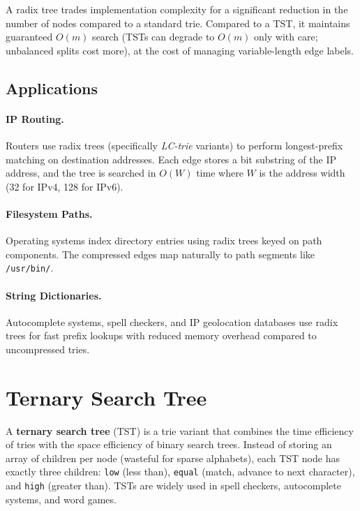 \noindent
A radix tree trades implementation complexity for a significant reduction in the number of nodes compared to a standard trie. Compared to a TST, it maintains guaranteed $O(m)$ search (TSTs can degrade to $O(m)$ only with care; unbalanced splits cost more), at the cost of managing variable-length edge labels.

\subsection{Applications}

\paragraph{IP Routing.} Routers use radix trees (specifically \emph{LC-trie} variants) to perform longest-prefix matching on destination addresses. Each edge stores a bit substring of the IP address, and the tree is searched in $O(W)$ time where $W$ is the address width (32 for IPv4, 128 for IPv6).

\paragraph{Filesystem Paths.} Operating systems index directory entries using radix trees keyed on path components. The compressed edges map naturally to path segments like \texttt{/usr/bin/}.

\paragraph{String Dictionaries.} Autocomplete systems, spell checkers, and IP geolocation databases use radix trees for fast prefix lookups with reduced memory overhead compared to uncompressed tries.

\section{Ternary Search Tree}

A \textbf{ternary search tree} (TST) is a trie variant that combines the time efficiency of tries with the space efficiency of binary search trees. Instead of storing an array of children per node (wasteful for sparse alphabets), each TST node has exactly three children: \texttt{low} (less than), \texttt{equal} (match, advance to next character), and \texttt{high} (greater than). TSTs are widely used in spell checkers, autocomplete systems, and word games.

